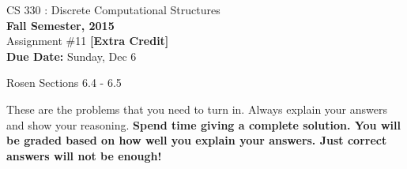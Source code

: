 \documentclass[11pt]{article}
\begin{document}
\begin{center}
{{\large CS 330 : Discrete Computational Structures}}\\


{\bf Fall Semester, 2015}\\

{\sc Assignment \#11} {\bf [Extra Credit]}\\
{\bf Due Date:}  Sunday, Dec 6
\end{center}

 Rosen Sections 6.4 - 6.5

These are the problems that you need to turn in. Always explain your answers and show your reasoning. 
{\bf Spend time giving a complete solution. You will be graded based on how well you explain your answers. 
Just correct answers will not be enough!}
\end{document}
